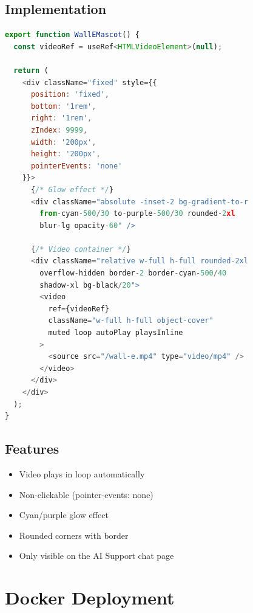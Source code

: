 \documentclass[12pt,a4paper]{article}
\begin{document}
\subsection{Implementation}
\begin{lstlisting}[language=JavaScript, caption=WallEMascot Component]
export function WallEMascot() {
  const videoRef = useRef<HTMLVideoElement>(null);

  return (
    <div className="fixed" style={{ 
      position: 'fixed', 
      bottom: '1rem', 
      right: '1rem', 
      zIndex: 9999,
      width: '200px',
      height: '200px',
      pointerEvents: 'none'
    }}>
      {/* Glow effect */}
      <div className="absolute -inset-2 bg-gradient-to-r 
        from-cyan-500/30 to-purple-500/30 rounded-2xl 
        blur-lg opacity-60" />
      
      {/* Video container */}
      <div className="relative w-full h-full rounded-2xl 
        overflow-hidden border-2 border-cyan-500/40 
        shadow-xl bg-black/20">
        <video
          ref={videoRef}
          className="w-full h-full object-cover"
          muted loop autoPlay playsInline
        >
          <source src="/wall-e.mp4" type="video/mp4" />
        </video>
      </div>
    </div>
  );
}
\end{lstlisting}

\subsection{Features}
\begin{itemize}
    \item Video plays in loop automatically
    \item Non-clickable (pointer-events: none)
    \item Cyan/purple glow effect
    \item Rounded corners with border
    \item Only visible on the AI Support chat page
\end{itemize}

\section{Docker Deployment}
\end{document}
